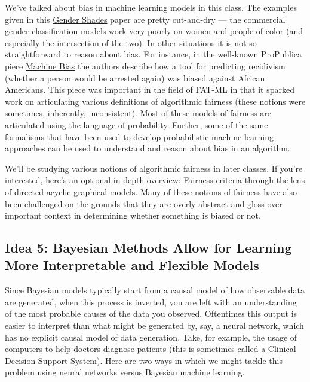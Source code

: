 \documentclass[assignment01_Solutions]{subfiles}
\begin{document}
We've talked about bias in machine learning models in this class.  The examples given in this \href{http://gendershades.org/overview.html}{Gender Shades} paper are pretty cut-and-dry --- the commercial gender classification models work very poorly on women and people of color (and especially the intersection of the two).  In other situations it is not so straightforward to reason about bias. For instance, in the well-known ProPublica piece \href{https://www.propublica.org/article/machine-bias-risk-assessments-in-criminal-sentencing}{Machine Bias} the authors describe how a tool for predicting recidivism (whether a person would be arrested again) was biased against African Americans.  This piece was important in the field of FAT-ML in that it sparked work on articulating various definitions of algorithmic fairness (these notions were sometimes, inherently, inconsistent).  Most of these models of fairness are articulated using the language of probability.  Further, some of the same formalisms that have been used to develop probabilistic machine learning approaches can be used to understand and reason about bias in an algorithm.

We'll be studying various notions of algorithmic fairness in later classes. If you're interested, here's an optional in-depth overview: \href{https://arxiv.org/pdf/1906.11333.pdf}{Fairness criteria through the lens of directed acyclic graphical models}.  Many of these notions of fairness have also been challenged on the grounds that they are overly abstract and gloss over important context in determining whether something is biased or not.


\subsection*{Idea 5: Bayesian Methods Allow for Learning More Interpretable and Flexible Models}

Since Bayesian models typically start from a causal model of how observable data are generated, when this process is inverted, you are left with an understanding of the most probable causes of the data you observed.  Oftentimes this output is easier to interpret than what might be generated by, say, a neural network, which has no explicit causal model of data generation.  Take, for example, the usage of computers to help doctors diagnose patients (this is sometimes called a \href{https://en.wikipedia.org/wiki/Clinical_decision_support_system}{Clinical Decision Support System}).  Here are two ways in which we might tackle this problem using neural networks versus Bayesian machine learning.
\end{document}
